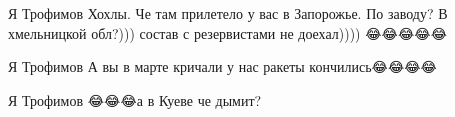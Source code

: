  
 
 
 
 

Я Трофимов
Хохлы. Че там прилетело у вас в Запорожье. По заводу? В хмельницкой обл?))) состав с резервистами не доехал)))) 😂😂😂😂😂

Я Трофимов
А вы в марте кричали у нас ракеты кончились😂😂😂😂

Я Трофимов
😂😂😂а в Куеве че дымит? 🤣🤣🤣

